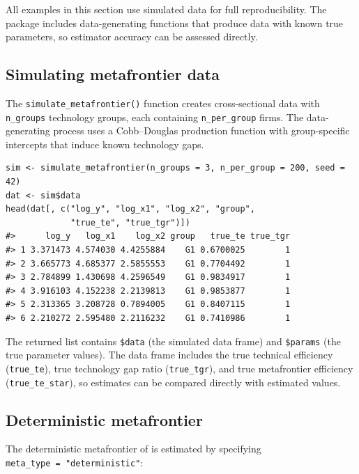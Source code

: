 All examples in this section use simulated data for full reproducibility. The
 package includes data-generating functions that produce
data with known true parameters, so estimator accuracy can be assessed
directly.

\subsection{Simulating metafrontier data}\label{sec:simulating-data}

The \texttt{simulate\_metafrontier()} function creates cross-sectional data with
\texttt{n\_groups} technology groups, each containing \texttt{n\_per\_group} firms. The
data-generating process uses a Cobb--Douglas production function with
group-specific intercepts that induce known technology gaps.

\begin{verbatim}
sim <- simulate_metafrontier(n_groups = 3, n_per_group = 200, seed = 42)
dat <- sim$data
head(dat[, c("log_y", "log_x1", "log_x2", "group",
             "true_te", "true_tgr")])
#>      log_y   log_x1    log_x2 group   true_te true_tgr
#> 1 3.371473 4.574030 4.4255884    G1 0.6700025        1
#> 2 3.665773 4.685377 2.5855553    G1 0.7704492        1
#> 3 2.784899 1.430698 4.2596549    G1 0.9834917        1
#> 4 3.916103 4.152238 2.2139813    G1 0.9853877        1
#> 5 2.313365 3.208728 0.7894005    G1 0.8407115        1
#> 6 2.210272 2.595480 2.2116232    G1 0.7410986        1
\end{verbatim}

The returned list contains \texttt{\$data} (the simulated data frame) and \texttt{\$params}
(the true parameter values). The data frame includes the true technical
efficiency (\texttt{true\_te}), true technology gap ratio (\texttt{true\_tgr}), and true
metafrontier efficiency (\texttt{true\_te\_star}), so estimates can be compared
directly with
estimated values.

\subsection{Deterministic metafrontier}\label{sec:det-metafrontier-usage}

The deterministic metafrontier of \citet{battese2004} is estimated by specifying
\texttt{meta\_type\ =\ "deterministic"}:

